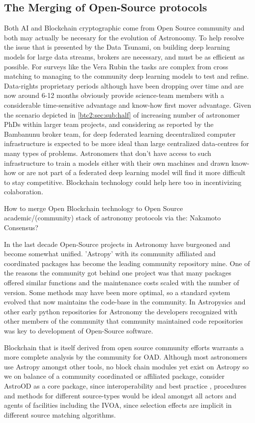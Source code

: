 \documentclass[final,5p,times,twocolumn,authoryear]{elsarticle}
\begin{document}
\subsection{The Merging of Open-Source protocols}

Both AI and Blockchain cryptographic come from Open Source community and both may actually be necesary for the evolution of Astronoomy. To help resolve the issue that is presented by the Data Tsunami, on building deep learning models for large data streams, brokers are necessary, and must be as efficient as possible. For surveys like the Vera Rubin the tasks are complex from cross matching to managing to the community deep learning models to test and refine. Data-rights proprietary periods although have been dropping over time and are now around 6-12 months obviously provide science-team members with a considerable time-sensitive advantage and know-how first mover advantage.  Given the scenario depicted in \ref{btc2:sec:sub:half} of increasing number of astronomer PhDs within larger team projects, and considering as reported by the Bambanunu broker team, for deep federated learning decentralized computer infrastructure is expected to be more ideal than large centralized data-centres for many types of problems.  Astronomers that don't have access to such infrastructure to train a models either with their own machines and drawn know-how or are not part of a federated deep learning model will find it more difficult to stay competitive. Blockchain technology could help here too in incentivizing colaboration.   

How to merge Open Blockchain technology to Open Source academic/(community) stack of astronomy protocols via the: Nakamoto Consensus?

In the last decade Open-Source projects in Astronomy have burgeoned and become somewhat unified. 'Astropy' with its community affiliated and coordinated packages has become the leading community repository mine.  One of the reasons the community got behind one project was that many packages offered similar functions and the maintenance costs scaled with the number of version. Some methods may have been more optimal, so a standard system evolved that now maintains the code-base in the community. In Astropysics and other early python repositories for Astronomy the developers recognized with other members of the community that community maintained code repositories was key to development of Open-Source software.

Blockchain that is itself derived from open source community efforts warrants a more complete analysis by the community for OAD. Although most astronomers use Astropy amongst other tools, no block chain modules yet exist on Astropy so we on balance of a community coordinated or affiliated package, consider AstroOD as a core package, since interoperability and best practice , procedures and methods for different source-types would be ideal amongst all actors and agents of facilities including the IVOA, since selection effects are implicit in different source matching algorithms.
\end{document}
